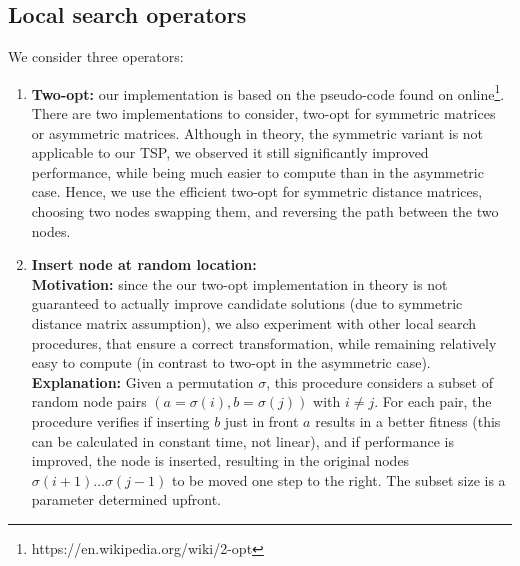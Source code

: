 \documentclass[a4paper,10pt]{article}
\begin{document}
\subsection{Local search operators} \label{cha:local search}
	We consider three operators:
	\begin{enumerate}
		\item \textbf{Two-opt:} our implementation is based on the pseudo-code found on online\footnote{https://en.wikipedia.org/wiki/2-opt}. There are two implementations to consider, two-opt for symmetric matrices or asymmetric matrices. Although in theory, the symmetric variant is not applicable to our TSP, we observed it still significantly improved performance, while being much easier to compute than in the asymmetric case. Hence, we use the efficient two-opt for symmetric distance matrices, choosing two nodes swapping them, and reversing the path between the two nodes.
		
		\item \textbf{Insert node at random location:}\\
		\textbf{Motivation:} since the our two-opt implementation in theory is not guaranteed to actually improve candidate solutions (due to symmetric distance matrix assumption), we also experiment with other local search procedures, that ensure a correct transformation, while remaining relatively easy to compute (in contrast to two-opt in the asymmetric case). \\
		\textbf{Explanation:} Given a permutation $\sigma$, this procedure considers a subset of random node pairs $\left(a = \sigma(i), b = \sigma(j)\right)$ with $i \neq j$. For each pair, the procedure verifies if inserting $b$ just in front $a$ results in a better fitness (this can be calculated in constant time, not linear), and if performance is improved, the node is inserted, resulting in the original nodes $\sigma(i+1) \dots \sigma(j-1)$ to be moved one step to the right. The subset size is a parameter determined upfront.


\end{enumerate}
\end{document}
